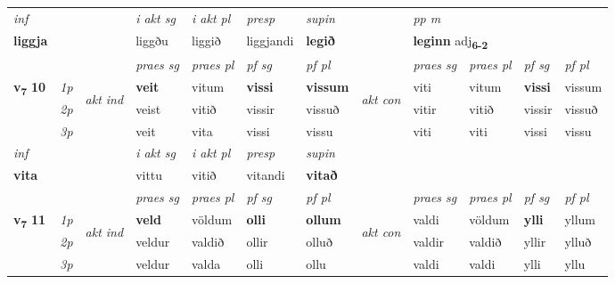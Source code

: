 \begin{longtable}[l]{X>{\footnotesize\itshape}llXXXXlXXXX}
\cmidrule{4-7}
   {\textit{inf}} & &  & \textit{i akt sg} & \textit{i akt pl}   & \textit{presp} & \textit{supin}  && \textit{pp m} \\*
  {\textbf{liggja}} & && liggðu  & liggið   & liggjandi &  \textbf{legið}  && \multicolumn{2}{l}{\textbf{leginn} adj\textbf{\textsubscript{6-2}}} \\*

\midrule

 & &   & \textit{praes sg}  & \textit{praes pl}    & \textit{ pf sg} & \textit{pf pl} & & \textit{praes sg}  & \textit{praes pl}    & \textit{pf sg} & \textit{pf pl }  \\ \cmidrule{4-7} \cmidrule{9-12}
 \multirow{2}{*}{{{\textbf{v{\textsubscript{7}}} \Large{\textbf{10}}}}}  & 1p & \multirow{3}{*}{\begin{turn}{90}\textit{akt ind}\end{turn}} & \textbf{veit} & vitum & \textbf{vissi} & \textbf{vissum} & \multirow{3}{*}{\begin{turn}{90}\textit{akt con}\end{turn}} &viti & vitum & \textbf{vissi} & vissum\\*
 & 2p &  &  veist  & vitið & vissir & vissuð & & vitir & vitið & vissir & vissuð \\*
 & 3p &  & veit & vita & vissi & vissu & & viti & viti& vissi & vissu \\*
\cmidrule{4-7} \cmidrule{9-12}

   {\textit{inf}} & &  & \textit{i akt sg} & \textit{i akt pl}   & \textit{presp} & \textit{supin}   \\*
  {\textbf{vita}} & && vittu  & vitið   & vitandi &  \textbf{vitað}   \\*

\midrule

 & &   & \textit{praes sg}  & \textit{praes pl}    & \textit{ pf sg} & \textit{pf pl} & & \textit{praes sg}  & \textit{praes pl}    & \textit{pf sg} & \textit{pf pl }  \\ \cmidrule{4-7} \cmidrule{9-12}
 \multirow{2}{*}{{{\textbf{v{\textsubscript{7}}} \Large{\textbf{11}}}}}  & 1p & \multirow{3}{*}{\begin{turn}{90}\textit{akt ind}\end{turn}} & \textbf{veld} & völdum & \textbf{olli} & \textbf{ollum} & \multirow{3}{*}{\begin{turn}{90}\textit{akt con}\end{turn}} &valdi & völdum & \textbf{ylli} & yllum\\*
 & 2p &  &  veldur  & valdið & ollir & olluð & & valdir & valdið & yllir & ylluð \\*
 & 3p &  & veldur & valda & olli & ollu & & valdi & valdi& ylli & yllu \\*
\cmidrule{4-7} \cmidrule{9-12}


\end{longtable}
